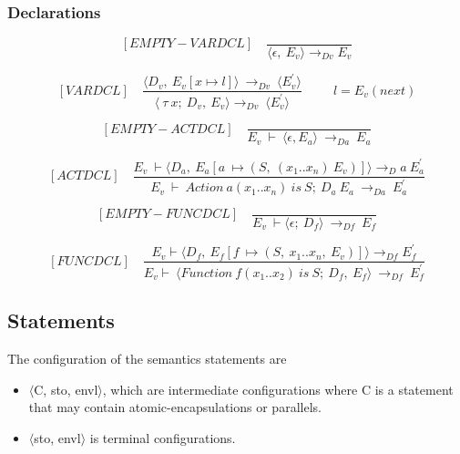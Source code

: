   \subsubsection{Declarations}
  	\[
	[EMPTY-VARDCL] \quad
	\dfrac{}{\langle\epsilon, \ E_v\rangle \rightarrow_{Dv} E_v}
	\]
    	
   	\[
   	[VARDCL] \quad
   	\dfrac{ \langle D_v, \ E_v[x \mapsto l]\rangle \ \rightarrow_{Dv} \ \langle E_v^{'} \rangle }{ \langle \ \tau \ x; \ D_v,\ E_v \rangle \rightarrow_{Dv} \ \langle E_v^{'} \rangle }
   	\qquad \ \ l = E_v(next)
   	\]
    	
   	\[
   	[EMPTY-ACTDCL] \quad
   	\dfrac{}{E_v \ \vdash \ \langle \epsilon, E_a \rangle \ \rightarrow_{Da} \ E_a}
   	\]
    	
    	
  	\[
   	[ACTDCL] \quad
   	\dfrac{E_v \ \vdash \langle D_a, \ E_a[a \ \mapsto (S, \ (x_1 .. x_n) \ E_v)] \rangle \rightarrow_Da \ E_a^{'}}{E_v \ \vdash \ Action \ a(x_1 .. x_n) \ is \ S; \ D_a \ E_a \ \rightarrow_{Da} \ E_a^{'}}
   	\]
    	
   	\[
   	[EMPTY-FUNCDCL] \quad
   	\dfrac{}{E_v \ \vdash \langle \epsilon; \ D_f \rangle \ \rightarrow_{Df} \ E_f}
   	\]
   	
   	\[
   	[FUNCDCL] \quad
   	\dfrac{E_v \vdash \langle D_f, \ E_f[f \ \mapsto (S, \ x_1 .. x_n, \ E_v)] \rangle \rightarrow_{Df} E_f^{'}}{E_v \vdash \ \langle Function \ f(x_1 .. x_2) \ is \ S; \ D_f, \ E_f \rangle \ \rightarrow_{Df} \ E_f^{'}}
   	\]
   	\subsection{Statements}
   	The configuration of the semantics statements are
   	
   	\begin{itemize}
   		\item \begin{math} \langle \end{math}C, sto, envl\begin{math} \rangle \end{math}, which are intermediate configurations where C is a statement that may contain atomic-encapsulations or parallels.
   		\item \begin{math} \langle \end{math}sto, envl\begin{math} \rangle \end{math} is terminal configurations.
   	\end{itemize}
   	
